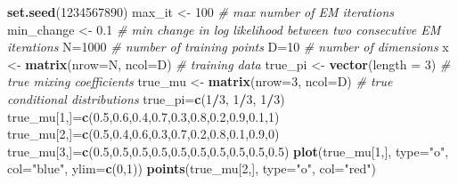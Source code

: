 \documentclass[]{article}
\newenvironment{Shaded}{\begin{snugshade}}{\end{snugshade}}
\newcommand{\KeywordTok}[1]{\textcolor[rgb]{0.13,0.29,0.53}{\textbf{#1}}}
\newcommand{\DataTypeTok}[1]{\textcolor[rgb]{0.13,0.29,0.53}{#1}}
\newcommand{\DecValTok}[1]{\textcolor[rgb]{0.00,0.00,0.81}{#1}}
\newcommand{\FloatTok}[1]{\textcolor[rgb]{0.00,0.00,0.81}{#1}}
\newcommand{\StringTok}[1]{\textcolor[rgb]{0.31,0.60,0.02}{#1}}
\newcommand{\CommentTok}[1]{\textcolor[rgb]{0.56,0.35,0.01}{\textit{#1}}}
\newcommand{\OperatorTok}[1]{\textcolor[rgb]{0.81,0.36,0.00}{\textbf{#1}}}
\newcommand{\NormalTok}[1]{#1}
\begin{document}
\begin{Shaded}
\begin{Highlighting}[]
\KeywordTok{set.seed}\NormalTok{(}\DecValTok{1234567890}\NormalTok{)}
\NormalTok{max_it <-}\StringTok{ }\DecValTok{100} \CommentTok{# max number of EM iterations}
\NormalTok{min_change <-}\StringTok{ }\FloatTok{0.1} \CommentTok{# min change in log likelihood between two consecutive EM iterations}
\NormalTok{N=}\DecValTok{1000} \CommentTok{# number of training points}
\NormalTok{D=}\DecValTok{10} \CommentTok{# number of dimensions}
\NormalTok{x <-}\StringTok{ }\KeywordTok{matrix}\NormalTok{(}\DataTypeTok{nrow=}\NormalTok{N, }\DataTypeTok{ncol=}\NormalTok{D) }\CommentTok{# training data}
\NormalTok{true_pi <-}\StringTok{ }\KeywordTok{vector}\NormalTok{(}\DataTypeTok{length =} \DecValTok{3}\NormalTok{) }\CommentTok{# true mixing coefficients}
\NormalTok{true_mu <-}\StringTok{ }\KeywordTok{matrix}\NormalTok{(}\DataTypeTok{nrow=}\DecValTok{3}\NormalTok{, }\DataTypeTok{ncol=}\NormalTok{D) }\CommentTok{# true conditional distributions}
\NormalTok{true_pi=}\KeywordTok{c}\NormalTok{(}\DecValTok{1}\OperatorTok{/}\DecValTok{3}\NormalTok{, }\DecValTok{1}\OperatorTok{/}\DecValTok{3}\NormalTok{, }\DecValTok{1}\OperatorTok{/}\DecValTok{3}\NormalTok{)}
\NormalTok{true_mu[}\DecValTok{1}\NormalTok{,]=}\KeywordTok{c}\NormalTok{(}\FloatTok{0.5}\NormalTok{,}\FloatTok{0.6}\NormalTok{,}\FloatTok{0.4}\NormalTok{,}\FloatTok{0.7}\NormalTok{,}\FloatTok{0.3}\NormalTok{,}\FloatTok{0.8}\NormalTok{,}\FloatTok{0.2}\NormalTok{,}\FloatTok{0.9}\NormalTok{,}\FloatTok{0.1}\NormalTok{,}\DecValTok{1}\NormalTok{)}
\NormalTok{true_mu[}\DecValTok{2}\NormalTok{,]=}\KeywordTok{c}\NormalTok{(}\FloatTok{0.5}\NormalTok{,}\FloatTok{0.4}\NormalTok{,}\FloatTok{0.6}\NormalTok{,}\FloatTok{0.3}\NormalTok{,}\FloatTok{0.7}\NormalTok{,}\FloatTok{0.2}\NormalTok{,}\FloatTok{0.8}\NormalTok{,}\FloatTok{0.1}\NormalTok{,}\FloatTok{0.9}\NormalTok{,}\DecValTok{0}\NormalTok{)}
\NormalTok{true_mu[}\DecValTok{3}\NormalTok{,]=}\KeywordTok{c}\NormalTok{(}\FloatTok{0.5}\NormalTok{,}\FloatTok{0.5}\NormalTok{,}\FloatTok{0.5}\NormalTok{,}\FloatTok{0.5}\NormalTok{,}\FloatTok{0.5}\NormalTok{,}\FloatTok{0.5}\NormalTok{,}\FloatTok{0.5}\NormalTok{,}\FloatTok{0.5}\NormalTok{,}\FloatTok{0.5}\NormalTok{,}\FloatTok{0.5}\NormalTok{)}
\KeywordTok{plot}\NormalTok{(true_mu[}\DecValTok{1}\NormalTok{,], }\DataTypeTok{type=}\StringTok{"o"}\NormalTok{, }\DataTypeTok{col=}\StringTok{"blue"}\NormalTok{, }\DataTypeTok{ylim=}\KeywordTok{c}\NormalTok{(}\DecValTok{0}\NormalTok{,}\DecValTok{1}\NormalTok{))}
\KeywordTok{points}\NormalTok{(true_mu[}\DecValTok{2}\NormalTok{,], }\DataTypeTok{type=}\StringTok{"o"}\NormalTok{, }\DataTypeTok{col=}\StringTok{"red"}\NormalTok{)}

\end{Highlighting}
\end{Shaded}
\end{document}

